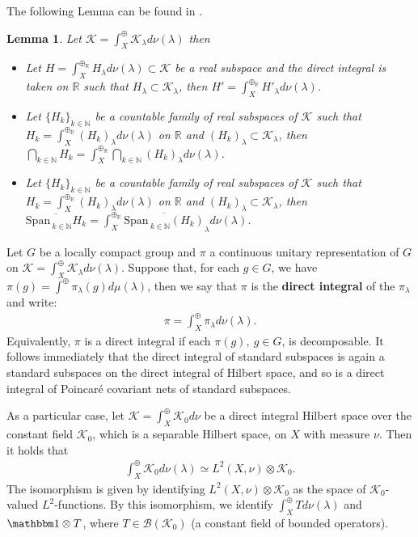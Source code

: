 \documentclass[12pt]{article}
\def\RR{{\mathbb R}}
\def\NN{{\mathbb N}}
\def\K{{\mathcal K}}
\def\l{\lambda}
\def\1{{\mathbbm 1}}
\def\Span{{\mathrm{Span}\,}}
\newtheorem{lemma}[theorem]{Lemma}
\theoremstyle{remark}
\begin{document}
The following Lemma can be found in \cite[Appendix B]{MT18}.
\begin{lemma}\label{lem:ABC}
Let $\K=\int_X^\oplus \K_\lambda d\nu(\lambda)$ then
\begin{itemize}
\item[(a)]
Let  $H=\int_X^{\oplus_\RR} H_\lambda d\nu(\lambda)\subset \K$ be a real subspace and the direct integral is taken on $\RR$
such that   $H_\lambda\subset \K_\lambda$,
then $H'=\int_X^{\oplus_\RR} H'_\lambda d\nu(\lambda)$.

\item[(b)] Let $\{H_k\}_{k\in\NN}$ be a countable family of real subspaces of $\K$ such that  $H_k=\int_X^{\oplus_\RR} (H_k)_\lambda d\nu(\lambda)$ on $\RR$
and  $(H_k)_\lambda\subset \K_\lambda$, then  $\bigcap_{k\in\NN} H_k=\int_X^{\oplus_\RR} \bigcap_{k\in\NN} (H_k)_\l d\nu(\l)$.

\item[(c)]  Let $\{H_k\}_{k\in\NN}$ be a countable family of real subspaces of $\K$ such that  $H_k=\int_X^{\oplus_\RR} (H_k)_\lambda d\nu(\lambda)$ on $\RR$
and  $(H_k)_\lambda\subset \K_\lambda$, then  $\overline{\Span_{k\in\NN} H_k}=\int_X^{\oplus_\RR} \overline{\Span_{k\in\NN} (H_k) }_\l d\nu(\l)$.
\end{itemize}
\end{lemma}
Let $G$ be a locally compact group and $\pi$ a continuous unitary representation of $G$ on $\K=\int^\oplus_X \K_\l d\nu(\lambda)$. Suppose that, for each $g\in G$, we have $\pi(g)=\int^\oplus \pi_\l (g) d\mu(\lambda)$, then we say that $\pi$ is the \textbf{direct integral} of the $\pi_\l $ and write: 
\begin{align*}
\pi=\int^\oplus_X \pi_\l d\nu(\lambda).
\end{align*}
Equivalently, $\pi$ is a direct integral if each $\pi(g), \ g\in G$, is decomposable.
It follows immediately that
the direct integral of standard subspaces is again a standard subspaces on the direct integral of Hilbert space,
and so is a direct integral of Poincar\'e covariant nets of standard subspaces.

As a particular case, let $\mathcal{K}= \int_X^\oplus \mathcal{K}_0 d\nu$ be a direct integral Hilbert space over the constant field $\mathcal{K}_0$,
which is a separable Hilbert space, on $X$ with measure $\nu$. Then it holds that \cite[Proposition II.1.8.11, Corollary]{Dixmier81}
\begin{align}\label{integral=tensor-prod}
\int_X^\oplus \mathcal{K}_0 d\nu(\l) \simeq L^2(X,\nu)\otimes \mathcal{K}_0.
\end{align}
The isomorphism is given by identifying $L^2(X,\nu)\otimes \K_0$ as the space of $\K_0$-valued $L^2$-functions.
By this isomorphism, we identify $\int_X^\oplus T d\nu(\l)$ and $\1\otimes T$, where $T\in \mathcal{B}(\mathcal{K}_0)$
(a constant field of bounded operators).
\end{document}
